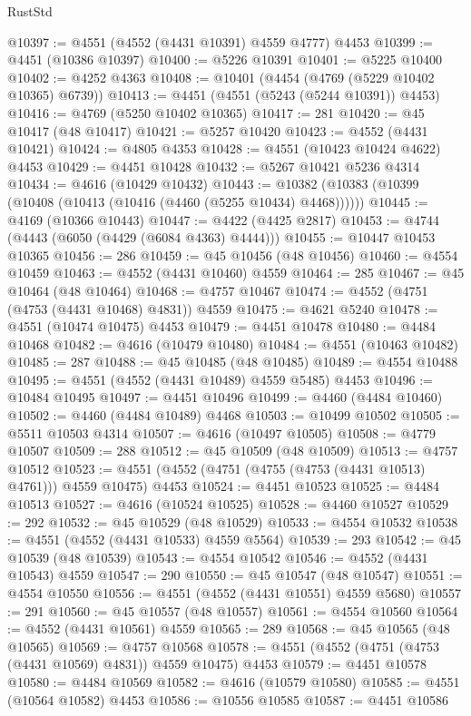 \begin{lexlean}{RustStd}
\begin{coremodule}
@10397 := @4551 (@4552 (@4431 @10391) @4559 @4777) @4453
@10399 := @4451 (@10386 @10397)
@10400 := @5226 @10391
@10401 := @5225 @10400
@10402 := @4252 @4363
@10408 := @10401 (@4454 (@4769 (@5229 @10402 @10365) @6739))
@10413 := @4451 (@4551 (@5243 (@5244 @10391)) @4453)
@10416 := @4769 (@5250 @10402 @10365)
@10417 := 281
@10420 := @45 @10417 (@48 @10417)
@10421 := @5257 @10420
@10423 := @4552 (@4431 @10421)
@10424 := @4805 @4353
@10428 := @4551 (@10423 @10424 @4622) @4453
@10429 := @4451 @10428
@10432 := @5267 @10421 @5236 @4314
@10434 := @4616 (@10429 @10432)
@10443 := @10382 (@10383 (@10399 (@10408 (@10413 (@10416 (@4460 (@5255 @10434) @4468))))))
@10445 := @4169 (@10366 @10443)
@10447 := @4422 (@4425 @2817)
@10453 := @4744 (@4443 (@6050 (@4429 (@6084 @4363) @4444)))
@10455 := @10447 @10453 @10365
@10456 := 286
@10459 := @45 @10456 (@48 @10456)
@10460 := @4554 @10459
@10463 := @4552 (@4431 @10460) @4559
@10464 := 285
@10467 := @45 @10464 (@48 @10464)
@10468 := @4757 @10467
@10474 := @4552 (@4751 (@4753 (@4431 @10468) @4831)) @4559
@10475 := @4621 @5240
@10478 := @4551 (@10474 @10475) @4453
@10479 := @4451 @10478
@10480 := @4484 @10468
@10482 := @4616 (@10479 @10480)
@10484 := @4551 (@10463 @10482)
@10485 := 287
@10488 := @45 @10485 (@48 @10485)
@10489 := @4554 @10488
@10495 := @4551 (@4552 (@4431 @10489) @4559 @5485) @4453
@10496 := @10484 @10495
@10497 := @4451 @10496
@10499 := @4460 (@4484 @10460)
@10502 := @4460 (@4484 @10489) @4468
@10503 := @10499 @10502
@10505 := @5511 @10503 @4314
@10507 := @4616 (@10497 @10505)
@10508 := @4779 @10507
@10509 := 288
@10512 := @45 @10509 (@48 @10509)
@10513 := @4757 @10512
@10523 := @4551 (@4552 (@4751 (@4755 (@4753 (@4431 @10513) @4761))) @4559 @10475) @4453
@10524 := @4451 @10523
@10525 := @4484 @10513
@10527 := @4616 (@10524 @10525)
@10528 := @4460 @10527
@10529 := 292
@10532 := @45 @10529 (@48 @10529)
@10533 := @4554 @10532
@10538 := @4551 (@4552 (@4431 @10533) @4559 @5564)
@10539 := 293
@10542 := @45 @10539 (@48 @10539)
@10543 := @4554 @10542
@10546 := @4552 (@4431 @10543) @4559
@10547 := 290
@10550 := @45 @10547 (@48 @10547)
@10551 := @4554 @10550
@10556 := @4551 (@4552 (@4431 @10551) @4559 @5680)
@10557 := 291
@10560 := @45 @10557 (@48 @10557)
@10561 := @4554 @10560
@10564 := @4552 (@4431 @10561) @4559
@10565 := 289
@10568 := @45 @10565 (@48 @10565)
@10569 := @4757 @10568
@10578 := @4551 (@4552 (@4751 (@4753 (@4431 @10569) @4831)) @4559 @10475) @4453
@10579 := @4451 @10578
@10580 := @4484 @10569
@10582 := @4616 (@10579 @10580)
@10585 := @4551 (@10564 @10582) @4453
@10586 := @10556 @10585
@10587 := @4451 @10586

\end{coremodule}
\end{lexlean}
